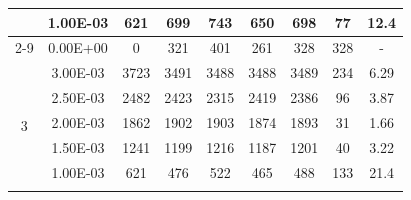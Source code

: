\begin{table}[H]
{\begin{tabular}{|c|c|c|c|c|c|c|c|c|}
                               & 1.00E-03         & 621       & 699                                                        & 743                                                       & 650                                                       & 698     & 77     & 12.4                                                               \\ \cline{2-9}
                               & 0.00E+00         & 0         & 321                                                        & 401                                                       & 261                                                       & 328     & 328    & -                                                                  \\ \hline
            \multirow{6}{*}{3} & 3.00E-03         & 3723      & 3491                                                       & 3488                                                      & 3488                                                      & 3489    & 234    & 6.29                                                               \\ \cline{2-9}
                               & 2.50E-03         & 2482      & 2423                                                       & 2315                                                      & 2419                                                      & 2386    & 96     & 3.87                                                               \\ \cline{2-9}
                               & 2.00E-03         & 1862      & 1902                                                       & 1903                                                      & 1874                                                      & 1893    & 31     & 1.66                                                               \\ \cline{2-9}
                               & 1.50E-03         & 1241      & 1199                                                       & 1216                                                      & 1187                                                      & 1201    & 40     & 3.22                                                               \\ \cline{2-9}
                               & 1.00E-03         & 621       & 476                                                        & 522                                                       & 465                                                       & 488     & 133    & 21.4                                                               \\ \cline{2-9}

\end{tabular}}
\end{table}
